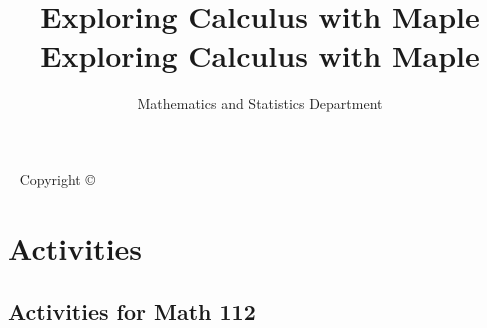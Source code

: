 \documentclass{tufte-book}
\title{Exploring Calculus with Maple \\ \noindent{\Huge Third Edition}}
\author[Math Stats]{Mathematics and Statistics Department}
\begin{document}
\frontmatter

\maketitle
\title{Exploring Calculus with Maple}

\newpage
\begin{fullwidth}
~\vfill
\thispagestyle{empty}
\setlength{\parindent}{0pt}
\setlength{\parskip}{\baselineskip}
Copyright \copyright\ \the\year\ \thanklessauthor
\par{}
\end{fullwidth}

\tableofcontents

\cleardoublepage


\mainmatter

\part{Activities}
\label{pt:Activities}

\chapter{Activities for Math 112}
\label{Calc1Activities}
\end{document}
